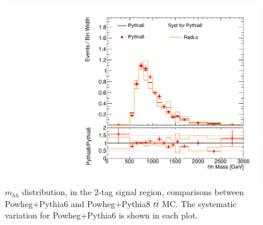 \begin{figure}[!h]
\begin{center}
\includegraphics[scale=0.33]{./figures/boosted/TTBarPy6VsPy8/TTBarPy6VsPy8_SR_hhMassRebin1_radlo}
\caption{$m_{hh}$ distribution, in the 2-tag signal region, comparisons between Powheg+Pythia6 and Powheg+Pythia8 $t\bar{t}$ MC. 
The systematic variation for Powheg+Pythia6 is shown in each plot.}
\label{fig:boosted_ttbarpy6py8_hhMass}
\end{center}
\end{figure}

